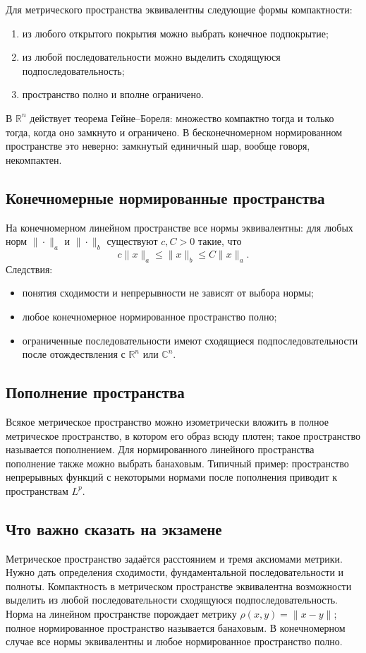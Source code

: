 Для метрического пространства эквивалентны следующие формы компактности:
\begin{enumerate}
    \item из любого открытого покрытия можно выбрать конечное подпокрытие;
    \item из любой последовательности можно выделить сходящуюся подпоследовательность;
    \item пространство полно и вполне ограничено.
\end{enumerate}

В $\mathbb R^n$ действует теорема Гейне--Бореля: множество компактно тогда и
только тогда, когда оно замкнуто и ограничено. В бесконечномерном нормированном
пространстве это неверно: замкнутый единичный шар, вообще говоря, некомпактен.

\subsection{Конечномерные нормированные пространства}

На конечномерном линейном пространстве все нормы эквивалентны: для любых норм
$\|\cdot\|_a$ и $\|\cdot\|_b$ существуют $c,C>0$ такие, что
\[
    c\|x\|_a\le \|x\|_b\le C\|x\|_a.
\]
Следствия:
\begin{itemize}
    \item понятия сходимости и непрерывности не зависят от выбора нормы;
    \item любое конечномерное нормированное пространство полно;
    \item ограниченные последовательности имеют сходящиеся подпоследовательности
    после отождествления с $\mathbb R^n$ или $\mathbb C^n$.
\end{itemize}

\subsection{Пополнение пространства}

Всякое метрическое пространство можно изометрически вложить в полное метрическое
пространство, в котором его образ всюду плотен; такое пространство называется
пополнением. Для нормированного линейного пространства пополнение также можно
выбрать банаховым. Типичный пример: пространство непрерывных функций с некоторыми
нормами после пополнения приводит к пространствам $L^p$.

\subsection{Что важно сказать на экзамене}

Метрическое пространство задаётся расстоянием и тремя аксиомами метрики. Нужно
дать определения сходимости, фундаментальной последовательности и полноты.
Компактность в метрическом пространстве эквивалентна возможности выделить из
любой последовательности сходящуюся подпоследовательность. Норма на линейном
пространстве порождает метрику $\rho(x,y)=\|x-y\|$; полное нормированное
пространство называется банаховым. В конечномерном случае все нормы эквивалентны
и любое нормированное пространство полно.

\newpage
